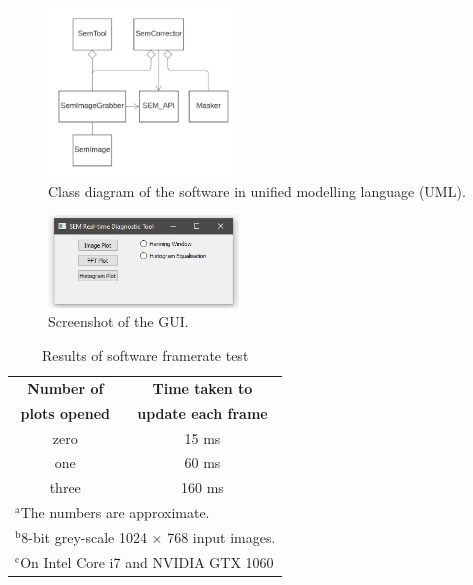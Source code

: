 \documentclass[12pt, twocolumn]{report}
\begin{document}
\begin{figure}[htbp]
    \centering
    \includegraphics[width=0.45\textwidth]{Figures/Software class diagram.png}
    \caption{Class diagram of the software in unified modelling language (UML).}
    \label{Software class diagram}
\end{figure}

\begin{figure}[htbp]
    \centering
    \includegraphics[width=0.45\textwidth]{Figures/Software screenshot.jpg}
    \caption{Screenshot of the GUI.}
    \label{Software GUI}
\end{figure}

\begin{table}[htbp]
    \caption{Results of software framerate test}
    \begin{center}
    \begin{tabular}{|c|c|}
    \hline
    \textbf{Number of} & \textbf{Time taken to} \\
    \textbf{plots opened} & \textbf{update each frame} \\
    \hline
    zero & 15 ms \\
    \hline
    one & 60 ms \\
    \hline
    three & 160 ms \\
    \hline
    \multicolumn{2}{l}{$^{\mathrm{a}}$The numbers are approximate.} \\
    \multicolumn{2}{l}{$^{\mathrm{b}}$8-bit grey-scale 1024 $\times$ 768 input images.} \\
    \multicolumn{2}{l}{$^{\mathrm{c}}$On Intel Core i7 and NVIDIA GTX 1060 }
    \end{tabular}
    \label{Test software framerates}
    \end{center}
\end{table}
\end{document}

